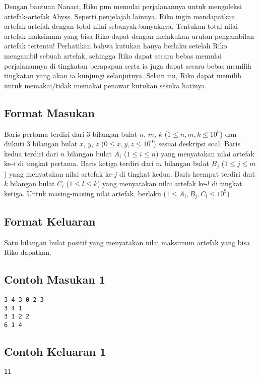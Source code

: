 \documentclass{article}
\begin{document}
Dengan bantuan Nanaci, Riko pun memulai perjalanannya untuk mengoleksi artefak-artefak Abyss. 
Seperti penjelajah lainnya, Riko ingin mendapatkan artefak-artefak dengan total nilai sebanyak-banyaknya. 
Tentukan total nilai artefak maksimum yang bisa Riko dapat dengan melakukan urutan pengambilan artefak tertentu! 
Perhatikan bahwa kutukan hanya berlaku setelah Riko mengambil sebuah artefak, sehingga Riko dapat secara bebas memulai perjalanannya di tingkatan berapapun serta ia juga dapat secara bebas memilih tingkatan yang akan ia kunjungi selanjutnya. Selain itu, Riko dapat memilih untuk memakai/tidak memakai penawar kutukan sesuka hatinya. 

\subsection*{Format Masukan}

Baris pertama terdiri dari 3 bilangan bulat $n$, $m$, $k$ ($1 \leq n,m,k \leq 10^5$)  dan diikuti 3 bilangan bulat $x$, $y$, $z$ ($0 \leq x,y,z \leq 10^9$) sesuai deskripsi soal.
Baris kedua terdiri dari $n$ bilangan bulat $A_i$ ($1 \leq i \leq n$) yang menyatakan nilai artefak ke-$i$ di tingkat pertama.
Baris ketiga terdiri dari $m$ bilangan bulat $B_j$ ($1 \leq j \leq m$) yang menyatakan nilai artefak ke-$j$ di tingkat kedua.
Baris keempat terdiri dari $k$ bilangan bulat $C_l$ ($1 \leq l \leq k$) yang menyatakan nilai artefak ke-$l$ di tingkat ketiga. Untuk masing-masing nilai artefak, berlaku ($1 \leq A_i,B_j,C_l \leq 10^9$)

\subsection*{Format Keluaran}

Satu bilangan bulat positif yang menyatakan nilai maksimum artefak yang bisa Riko dapatkan.


\begin{multicols}{2}
\subsection*{Contoh Masukan 1}
\begin{lstlisting}
3 4 3 0 2 3
3 4 1
3 1 2 2
6 1 4
\end{lstlisting}
\columnbreak
\subsection*{Contoh Keluaran 1}
\begin{lstlisting}
11
\end{lstlisting}
\vfill
\null
\end{multicols}
\end{document}
